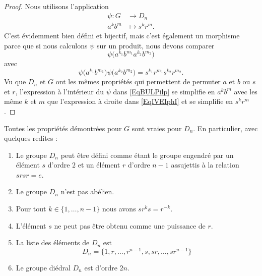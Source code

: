\begin{proof}
	Nous utilisons l'application
	\begin{equation}
		\begin{aligned}
			\psi\colon G & \to D_n         \\
			a^kb^m       & \mapsto s^kr^m.
		\end{aligned}
	\end{equation}
	C'est évidemment bien défini et bijectif, mais c'est également un morphisme parce que si nous calculons \( \psi\) sur un produit, nous devons comparer
	\begin{equation}        \label{EqBULPilp}
		\psi\big( a^{k_1}b^{m_1}a^{k_2}b^{m_2} \big)
	\end{equation}
	avec
	\begin{equation}        \label{EqIVEIphI}
		\psi\big( a^{k_1}b^{m_1}\big)\psi\big(a^{k_2}b^{m_2} \big)= s^{k_1}r^{m_1}s^{k_2}r^{m_2}.
	\end{equation}
	Vu que \( D_n\) et \( G\) ont les mêmes propriétés qui permettent de permuter \( a\) et \( b\) ou \( s\) et \( r\), l'expression à l'intérieur du \( \psi\) dans \eqref{EqBULPilp} se simplifie en \( a^kb^m\) avec les même \( k\) et \( m\) que l'expression à droite dans \eqref{EqIVEIphI} et se simplifie en \( s^kr^m\).
\end{proof}

\begin{corollary}
	Toutes les propriétés démontrées pour \( G\) sont vraies pour \( D_n\). En particulier, avec quelques redites :
	\begin{enumerate}
		\item
		      Le groupe \( D_n\) peut être défini comme étant le groupe engendré par un élément \( s\) d'ordre \( 2\) et un élément \( r\) d'ordre \( n-1\) assujettis à la relation \( srsr=e\).
		\item
		      Le groupe \( D_n\) n'est pas abélien.
		\item
		      Pour tout \( k\in\{ 1,\ldots, n-1 \}\) nous avons \( sr^ks=r^{-k}\).
		\item
		      L'élément \( s\) ne peut pas être obtenu comme une puissance de \( r\).
		\item
		      La liste des éléments de \( D_n\) est
		      \begin{equation}
			      D_n=\{ 1,r,\ldots, r^{n-1},s,sr,\ldots, sr^{n-1} \}
		      \end{equation}
		\item
		      Le groupe diédral \( D_n\) est d'ordre \( 2n\).
	\end{enumerate}
\end{corollary}

